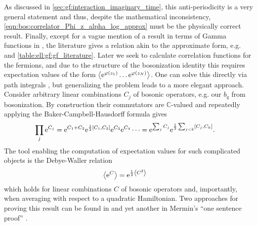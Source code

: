 As discussed in \autoref{sec:gf:interaction_imaginary_time}, this anti-periodicity is a very general statement and thus, despite the mathematical inconsistency, \autoref{eqn:bos:correlator_Phi_z_alpha_log_approx} must be the physically correct result.
Finally, except for a vague mention of a result in terms of Gamma functions in \cite[]{Bosonization_FiniteT_Bowen_2001}, the literature gives a relation akin to the approximate form, e.g. \cites[\sapp C]{Giamarchi_2004}[]{Fradkin_2013}[]{Bosonization_Rao_2001}[]{Bosonization_DelftSchoeller_1998} and \autoref{table:ell:gf:gf_literature}.
Later we seek to calculate correlation functions for the fermions, and due to the structure of the bosonization identity this requires expectation values of the form $\bra*{\powe{\varphi(z_1)} \dots \powe{\varphi(z_N)}}$.
One can solve this directly via path integrals \cite[\sapp C]{Giamarchi_2004}, but generalizing the problem leads to a more elegant approach.\\
Consider arbitrary linear combinations $C_j$ of bosonic operators, e.g. our $b_q$ from bosonization.
By construction their commutators are $\mathbb{C}$-valued and repeatedly applying the Baker-Campbell-Hausdorff formula gives
\begin{align*}
\prod_j \powe{C_j} &= \powe{C_1 + C_2} \powe{\frac{1}{2}\klb*{C_1, C_2}} \powe{C_3} \powe{C_4} \dots = \powe{\sum_j C_j} \powe{\frac{1}{2} \sum_{j<k} \klb*{C_j,C_k}}.
\end{align*}
The tool enabling the computation of expectation values for such complicated objects is the Debye-Waller relation
\begin{align}
\bra[\big]{\powe{C}} &= \powe{\frac{1}{2} \bra*{C^2}} \label{eqn:bos:debye_waller}
\end{align}
which holds for linear combinations $C$ of bosonic operators and, importantly, when averaging with respect to a quadratic Hamiltonian.
Two approaches for proving this result can be found in \cite[\sapp C, J]{Bosonization_DelftSchoeller_1998} and yet another in Mermin's ``one sentence proof'' \cite{DebyeWaller_1sent_Mermin_1966}.\\
